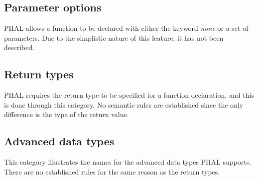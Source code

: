 \subsection*{Parameter options}
PHAL allows a function to be declared with either the keyword \textit{none} or a set of parameters. Due to the simplistic nature of this feature, it has not been described.
\subsection*{Return types}
PHAL requires the return type to be specified for a function declaration, and this is done through this category. No semantic rules are established since the only difference is the type of the return value.
\subsection*{Advanced data types}
This category illustrates the names for the advanced data types PHAL supports. There are no established rules for the same reason as the return types.